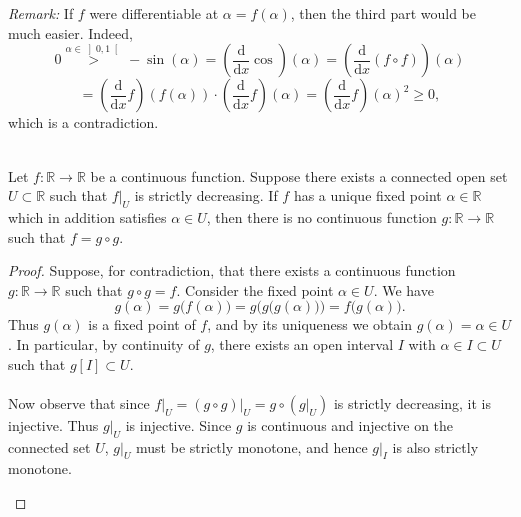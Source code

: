 \begin{solution}
    \textit{Remark:} If \( f \) were differentiable at \( \alpha = f\left(\alpha\right) \), then the third part would be much easier. Indeed,
    \[
        0 \overset{\alpha \in \left] 0,1 \right[}{>} -\sin\left(\alpha\right) = \left( \frac{\mathrm{d}}{\mathrm{d}x} \cos \right)\left(\alpha\right)= \left( \frac{\mathrm{d}}{\mathrm{d}x} \left( f \circ f \right) \right)\left(\alpha\right)
    \]
    \[
        = \left( \frac{\mathrm{d}}{\mathrm{d}x} f \right)\!\left( f\left(\alpha\right) \right) \cdot \left( \frac{\mathrm{d}}{\mathrm{d}x} f \right)\left(\alpha\right) = \left( \frac{\mathrm{d}}{\mathrm{d}x} f \right)\left(\alpha\right)^{2} \geq 0,
    \]
    which is a contradiction.
    \\\\
    \begin{lemma} Let \( f: \mathbb{R}\to \mathbb{R} \) be a continuous function. Suppose there
        exists a connected open set \( U \subset \mathbb{R} \) such that \( \left.f \right|_{U} \) is strictly decreasing. If \( f \) has a unique fixed point \( \alpha\in\mathbb{R} \) which in addition satisfies \( \alpha \in U \), then there is no continuous function \( g: \mathbb{R} \to \mathbb{R} \) such that \( f = g \circ g \).
    \end{lemma}
    \begin{proof}
        Suppose, for contradiction, that there exists a continuous function \( g: \mathbb{R} \to \mathbb{R} \) such that \( g \circ g = f \). Consider the fixed point \( \alpha \in U \). We have
        \[
            g\left(\alpha\right) = g\bigl( f\left(\alpha\right) \bigr) = g\bigl( g\bigl( g\left(\alpha\right) \bigr) \bigr) = f\bigl( g\left(\alpha\right) \bigr).
        \]
        Thus \( g\left(\alpha\right) \) is a fixed point of \( f \), and by its uniqueness we obtain \( g\left(\alpha\right) = \alpha \in U \). In particular, by continuity of \( g \), there exists an open interval \( I \) with \( \alpha \in I \subset U \) such that \( g\left[I\right] \subset U \).
        \\\\
        Now observe that since \( \left. f \right|_{U} = \left. \left( g \circ g \right) \right|_{U}=g \circ \left(\left. g \right|_{U}\right) \) is strictly decreasing, it is injective. Thus \( \left. g \right|_{U} \) is injective. Since \( g \) is continuous and injective on the connected set \( U \), \( \left. g \right|_{U} \) must be strictly monotone, and hence \( \left. g \right|_{I} \) is also strictly monotone.
        \begin{enumerate}

\end{enumerate}
\end{proof}
\end{solution}
